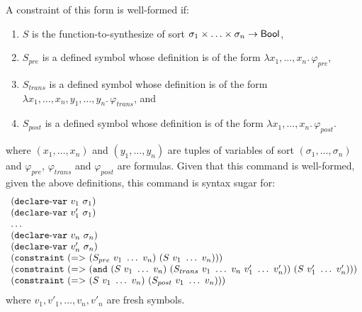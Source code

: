 \documentclass[english,a4paper,10pt]{article}
\begin{document}
\begin{itemize}
A constraint of this form is well-formed if:
\begin{enumerate}
\item
$S$ is the function-to-synthesize
of sort $\sigma_1 \times \ldots \times \sigma_n \rightarrow \mathsf{Bool}$,
\item
$S_{pre}$ is a defined symbol 
whose definition is of the form $\lambda x_1, \ldots, x_n.\, \varphi_{pre}$,
\item
$S_{trans}$ is a defined symbol 
whose definition is of the form $\lambda x_1, \ldots, x_n, y_1, \ldots, y_n.\, \varphi_{trans}$, and
\item
$S_{post}$ is a defined symbol 
whose definition is of the form $\lambda x_1, \ldots, x_n.\, \varphi_{post}$.
\end{enumerate}
where $(x_1, \ldots, x_n)$ and $(y_1, \ldots, y_n)$
are tuples of variables of sort $(\sigma_1, \ldots, \sigma_n)$ and
$\varphi_{pre}$, $\varphi_{trans}$ and $\varphi_{post}$ are formulas.
Given that this command is well-formed, given the above definitions,
this command is syntax sugar for:
\[
\begin{array}{l}
{\tt (}{\tt declare\mbox{-}var}\mbox{ }v_1\mbox{ }\sigma_1{\tt )}\\
{\tt (}{\tt declare\mbox{-}var}\mbox{ }v'_1\mbox{ }\sigma_1{\tt )}\\
\ldots\\
{\tt (}{\tt declare\mbox{-}var}\mbox{ }v_n\mbox{ }\sigma_n{\tt )}\\
{\tt (}{\tt declare\mbox{-}var}\mbox{ }v'_n\mbox{ }\sigma_n{\tt )}\\
{\tt (}{\tt constraint}\mbox{ }{\tt (}{\tt =>}\mbox{ }
{\tt (}S_{pre}\mbox{ }v_1\mbox{ }\ldots\mbox{ }v_n{\tt )}\mbox{ }
{\tt (}S\mbox{ }v_1\mbox{ }\ldots\mbox{ }v_n{\tt )}{\tt )}{\tt )}\\
{\tt (}{\tt constraint}\mbox{ }{\tt (}{\tt =>}\mbox{ }
{\tt (}{\tt and}\mbox{ }{\tt (}S\mbox{ }v_1\mbox{ }\ldots\mbox{ }v_n{\tt )}\mbox{ }
{\tt (}S_{trans}\mbox{ }v_1\mbox{ }\ldots\mbox{ }v_n\mbox{ }v'_1\mbox{ }\ldots\mbox{ }v'_n{\tt )}{\tt )}\mbox{ }
{\tt (}S\mbox{ }v'_1\mbox{ }\ldots\mbox{ }v'_n{\tt )}{\tt )}{\tt )}\\
{\tt (}{\tt constraint}\mbox{ }{\tt (}{\tt =>}\mbox{ }
{\tt (}S\mbox{ }v_1\mbox{ }\ldots\mbox{ }v_n{\tt )}\mbox{ }
{\tt (}S_{post}\mbox{ }v_1\mbox{ }\ldots\mbox{ }v_n{\tt )}{\tt )}{\tt )}\\
\end{array}
\]
where $v_1, v'_1, \ldots, v_n, v'_n$ are fresh symbols.

\end{itemize}
\end{document}
